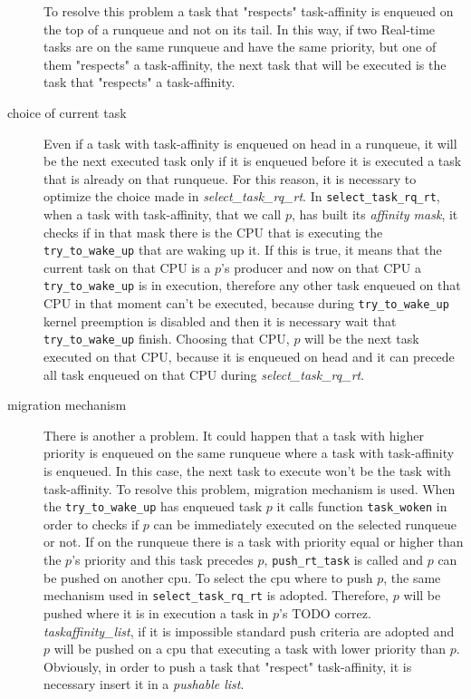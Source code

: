 \begin{description}
To resolve this problem a task that "respects" task-affinity is enqueued on the top of a runqueue and not on its tail. In this way, if two Real-time tasks 
are on the same runqueue and have the same priority, but one of them "respects" a task-affinity, the next task that will be executed is the task that 
"respects" a task-affinity. 

\item[choice of current task] Even if a task with task-affinity is enqueued on head in a runqueue, it will be the next executed task only if it is 
enqueued before it is executed a task that is already on that runqueue. For this reason, it is necessary to optimize the choice made in 
\textit{select\_task\_rq\_rt}. In \texttt{select\_task\_rq\_rt}, when a task with task-affinity, that we call $p$, has built its \textit{affinity mask}, 
it checks if in that mask there is the CPU that is executing the \texttt{try\_to\_wake\_up} that are waking up it. If this is true, it means that the 
current task on that CPU is a $p$'s producer and now on that CPU a \texttt{try\_to\_wake\_up} is in execution, therefore any other task enqueued on that 
CPU in that moment can't be executed, because during \texttt{try\_to\_wake\_up} kernel preemption is disabled and then it is necessary wait that 
\texttt{try\_to\_wake\_up} finish. Choosing that CPU, $p$ will be the next task executed on that CPU, because it is enqueued on head and it can precede 
all task enqueued on that CPU during \textit{select\_task\_rq\_rt}.

\item[migration mechanism] There is another a problem. It could happen that a task with higher priority is enqueued on the same runqueue where a task with 
task-affinity is enqueued. In this case, the next task to execute won't be the task with task-affinity.
To resolve this problem, migration mechanism is used. When the \texttt{try\_to\_wake\_up} has enqueued task $p$ it calls function \texttt{task\_woken} in 
order to checks if $p$ can be immediately executed on the selected runqueue or not. If on the runqueue there is a task with priority equal or higher than 
the $p$'s priority and this task precedes $p$, \texttt{push\_rt\_task} is called and $p$ can be pushed on another cpu. To select the cpu where to push $p$, 
the same mechanism used in \texttt{select\_task\_rq\_rt} is adopted. Therefore, $p$ will be pushed where it is in execution a task in $p$'s TODO correz. 
\textit{taskaffinity\_list}, if it is impossible standard push criteria are adopted and $p$ will be pushed on a cpu that executing a task with lower 
priority than $p$. Obviously, in order to push a task that "respect" task-affinity, it is necessary insert it in a \textit{pushable list}. 

\end{description}
